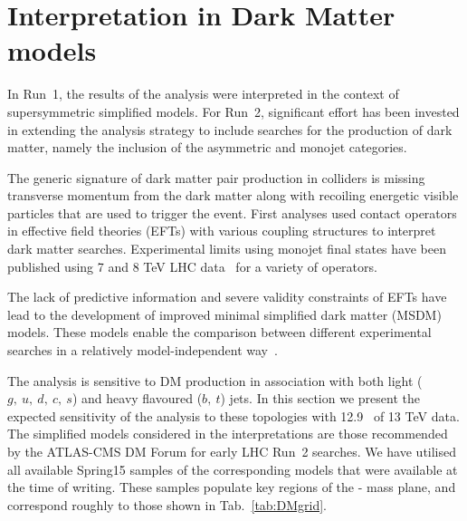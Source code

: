 \section{Interpretation in Dark Matter models} \label{sec:darkmatter}

In Run~1, the results of the \alphat analysis were interpreted in the context of
supersymmetric simplified models. For Run~2, significant effort has been invested
in extending the analysis strategy to include searches for the production of dark
matter, namely the inclusion of the asymmetric and monojet categories.

The generic signature of dark matter pair production in colliders is missing
transverse momentum from the dark matter along with recoiling energetic visible
particles that are used to trigger the event. First analyses used contact 
operators~\cite{Goodman:2010ku} in effective field theories (EFTs) with various 
coupling structures to interpret dark matter searches. Experimental limits using
monojet final states have been published using 7 and 8 TeV LHC 
data~\cite{Chatrchyan:2012me,ATLAS:2012ky} for a variety of operators.


The lack of predictive information and severe validity constraints of EFTs have
lead to the development of improved minimal simplified dark matter (MSDM) models.
These models enable the comparison between different experimental
searches in a relatively model-independent way~\cite{Buchmueller:2014yoa}.


The \alphat analysis is sensitive to DM production in association with both
light ($g,~u,~d,~c,~s$) and heavy flavoured ($b,~t$) jets. In this section we
present the expected sensitivity of the analysis to these topologies with 12.9~\ifb
of 13 TeV data. The simplified models considered in the interpretations are those
recommended by the ATLAS-CMS DM Forum for early LHC Run~2 searches. We have
utilised all available Spring15 samples of the corresponding models that were
available at the time of writing. These samples populate key regions of the
{\mphi-\mchi} mass plane, and correspond roughly to those shown in
Tab.~\ref{tab:DMgrid}.

